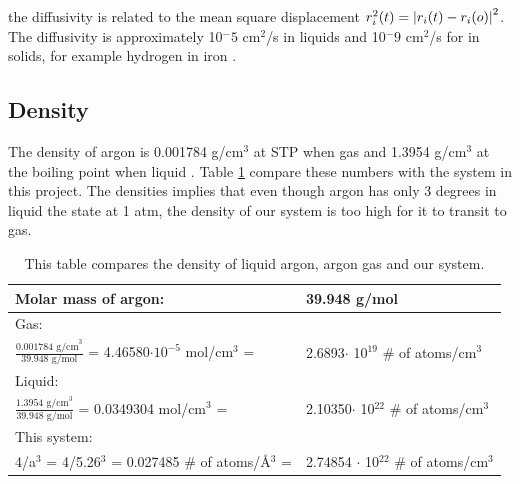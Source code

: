 the diffusivity is related to the mean square displacement $ r_i^2(t) = \abs{r_i(t) - r_i(o)}^2 $. The diffusivity is approximately 10$^-5$ cm$^2$/s in liquids and 10$^-9$ cm$^2$/s for in solids, for example hydrogen in iron \cite{wiki_diff}. 

\subsection{Density}

The density of argon is 0.001784 g/cm$^3$ at STP when gas and 1.3954 g/cm$^3$ at the boiling point when liquid \cite{argon}. Table \ref{tab:density} compare these numbers with the system in this project. The densities implies that even though argon has only 3 degrees in liquid the state at 1 atm, the density of our system is too high for it to transit to gas. 

\begin{table}\caption{This table compares the density of liquid argon, argon gas and our system.}\label{tab:density}
\begin{tabular}{ll}
Molar mass of argon:& 39.948 g/mol\\ \hline
Gas:& \\
$\frac{0.001784 \text{ g/cm}^3 }{39.948 \text{ g/mol}}$ = 4.46580$\cdot 10^{-5}$ mol/cm$^3$ = & 2.6893$\cdot$ 10$^{19}$ \# of atoms/cm$^3$\\
Liquid:&\\
$\frac{1.3954 \text{ g/cm}^3 }{39.948 \text{ g/mol}}$ = 0.0349304 mol/cm$^3$ =& 2.10350$\cdot$ 10$^{22}$ \# of atoms/cm$^3$\\
This system:& \\
 4/a$^3$ = 4/5.26$^3$ = 0.027485 \# of atoms/Å$^3$ =& 2.74854 $\cdot$ 10$^{22}$ \# of atoms/cm$^3$\\
\end{tabular}
\end{table}